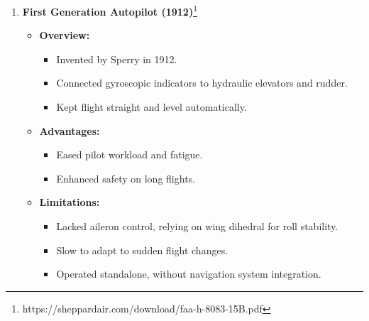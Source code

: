 \documentclass[math,code]{amznotes}
\theoremstyle{remark}
\begin{document}
\begin{enumerate}
    \item \textbf{First Generation Autopilot (1912)}\footnote{https://sheppardair.com/download/faa-h-8083-15B.pdf}
    \begin{itemize}
        \item \textbf{Overview:}
        \begin{itemize}
            \item Invented by Sperry in 1912.
            \item Connected gyroscopic indicators to hydraulic elevators and rudder.
            \item Kept flight straight and level automatically.
        \end{itemize}
        \item \textbf{Advantages:}
        \begin{itemize}
            \item Eased pilot workload and fatigue.
            \item Enhanced safety on long flights.
        \end{itemize}
        \item \textbf{Limitations:}
        \begin{itemize}
            \item Lacked aileron control, relying on wing dihedral for roll stability.
            \item Slow to adapt to sudden flight changes.
            \item Operated standalone, without navigation system integration.
        \end{itemize}
    \end{itemize}
    

\end{enumerate}
\end{document}

